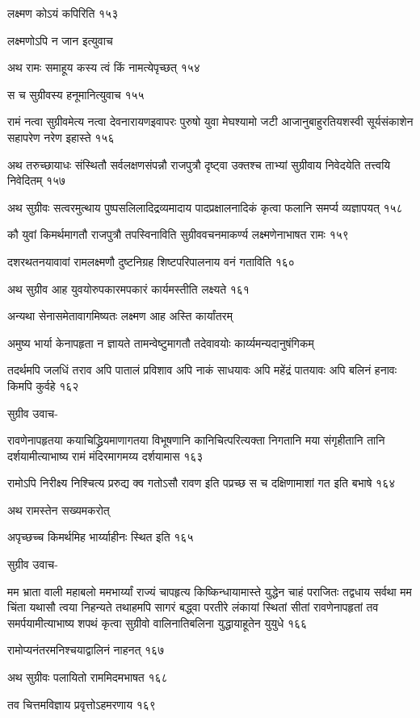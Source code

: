 लक्ष्मण कोऽयं कपिरिति १५३

लक्ष्मणोऽपि न जान इत्युवाच

अथ रामः समाहूय कस्य त्वं किं नामत्येपृच्छत् १५४

स च सुग्रीवस्य हनूमानित्युवाच १५५

रामं नत्वा सुग्रीवमेत्य नत्वा देवनारायणइवापरः पुरुषो युवा मेघश्यामो जटी
आजानुबाहुरतियशस्वी सूर्यसंकाशेन सहापरेण नरेण इहास्ते १५६

अथ तरुच्छायाधः संस्थितौ सर्वलक्षणसंपन्नौ राजपुत्रौ दृष्ट्वा उक्तश्च ताभ्यां सुग्रीवाय
निवेदयेति तत्त्वयि निवेदितम् १५७

अथ सुग्रीवः सत्वरमुत्थाय पुष्पसलिलादिद्रव्यमादाय पादप्रक्षालनादिकं कृत्वा फलानि समर्प्य
व्यज्ञापयत् १५८

कौ युवां किमर्थमागतौ राजपुत्रौ तपस्विनाविति सुग्रीववचनमाकर्ण्य लक्ष्मणेनाभाषत रामः
१५९

दशरथतनयावावां रामलक्ष्मणौ दुष्टनिग्रह शिष्टपरिपालनाय वनं गताविति १६०

अथ सुग्रीव आह युवयोरुपकारमपकारं कार्यमस्तीति लक्ष्यते १६१

अन्यथा सेनासमेतावागमिष्यतः लक्ष्मण आह अस्ति कार्यांतरम्

अमुष्य भार्या केनापहृता न ज्ञायते तामन्वेष्टुमागतौ तदेवावयोः कार्य्यमन्यदानुषंगिकम्

तदर्थमपि जलधिं तराव अपि पातालं प्रविशाव अपि नाकं साधयावः अपि महेंद्रं पातयावः अपि
बलिनं हनावः किमपि कुर्वहे १६२

सुग्रीव उवाच-

रावणेनापहृतया कयाचिद्ध्रियमाणागतया विभूषणानि कानिचित्परित्यक्ता निगतानि मया
संगृहीतानि तानि दर्शयामीत्याभाष्य रामं मंदिरमागमय्य दर्शयामास १६३

रामोऽपि निरीक्ष्य निश्चित्य प्ररुद्य क्व गतोऽसौ रावण इति पप्रच्छ स च दक्षिणामाशां गत
इति बभाषे १६४

अथ रामस्तेन सख्यमकरोत्

अपृच्छच्च किमर्थमिह भार्य्याहीनः स्थित इति १६५

सुग्रीव उवाच-

मम भ्राता वाली महाबलो ममभार्य्यां राज्यं चापहृत्य किष्किन्धायामास्ते युद्धेन चाहं
पराजितः तद्वधाय सर्वथा मम चिंता यथासौ त्वया निहन्यते तथाहमपि सागरं बद्ध्वा परतीरे
लंकायां स्थितां सीतां रावणेनापहृतां तव समर्पयामीत्याभाष्य शपथं कृत्वा सुग्रीवो
वालिनातिबलिना युद्धायाहूतेन युयुधे १६६

रामोप्यनंतरमनिश्चयाद्वालिनं नाहनत् १६७

अथ सुग्रीवः पलायितो राममिदमभाषत १६८

तव चित्तमविज्ञाय प्रवृत्तोऽहमरणाय १६९

